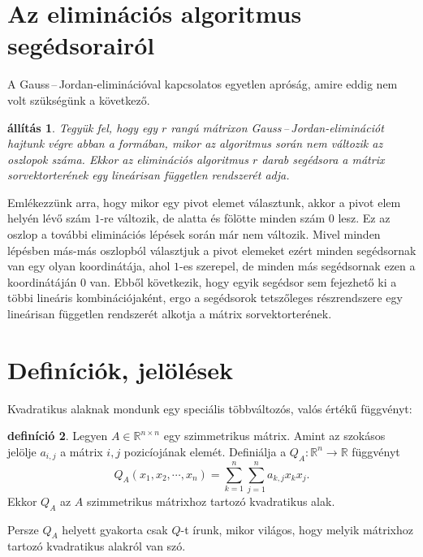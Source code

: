 \documentclass[a4paper, showtrims]{memoir}
\makeatletter
\renewenvironment{proof}[1][\proofname]
    {\par\pushQED{\qed}%
    \normalfont \topsep6\p@\@plus6\p@\relax
    \trivlist
    \item[\hskip\labelsep
        \itshape
    #1\@addpunct{:}]\ignorespaces}
    {\popQED\endtrivlist\@endpefalse}
\theoremstyle{plain}
\newtheorem{proposition}{állítás}[chapter]
\theoremstyle{remark}
\theoremstyle{definition}
\newtheorem{definition}[proposition]{definíció}
\makeatother
\begin{document}
\section{Az eliminációs algoritmus segédsorairól}
A Gauss\,--\,Jordan-eliminációval kapcsolatos egyetlen apróság, amire eddig nem volt szükségünk a következő.
\begin{proposition}
    Tegyük fel, hogy egy $r$ rangú mátrixon Gauss\,--\,Jordan-eliminációt hajtunk végre abban a formában,
    mikor az algoritmus során nem változik az oszlopok száma.
    Ekkor az eliminációs algoritmus $r$ darab segédsora a mátrix sorvektorterének egy lineárisan független rendszerét adja.
\end{proposition}
\begin{proof}
    Emlékezzünk arra, hogy mikor egy pivot elemet választunk,
    akkor a pivot elem helyén lévő szám $1$-re változik, 
    de alatta és fölötte minden szám $0$ lesz.
    Ez az oszlop a további eliminációs lépések során már nem változik.
    Mivel minden lépésben más-más oszlopból választjuk a pivot elemeket ezért minden segédsornak van egy olyan 
    koordinátája, ahol $1$-es szerepel, de minden más segédsornak ezen a koordinátáján $0$ van.
    Ebből következik, hogy egyik segédsor sem fejezhető ki a többi lineáris kombinációjaként, 
    ergo a segédsorok tetszőleges részrendszere egy lineárisan független rendszerét alkotja a mátrix sorvektorterének.
\end{proof}
\section{Definíciók, jelölések}
Kvadratikus alaknak mondunk egy speciális többváltozós, valós értékű függvényt:
\begin{definition}
    Legyen $A\in\mathbb{R}^{n\times n}$ egy szimmetrikus mátrix.
    Amint az szokásos jelölje $a_{i,j}$ a mátrix $i,j$ pozicíojának elemét.
    Definiálja a $Q_A:\mathbb{R}^n\to\mathbb{R}$ függvényt
    \[
    Q_A\left( x_{1},x_2,\cdots,x_n \right)=
    \sum_{k=1}^n\sum_{j=1}^na_{k,j}x_kx_j.
    \]
    Ekkor $Q_A$ az $A$ szimmetrikus mátrixhoz tartozó kvadratikus alak.
\end{definition}
Persze $Q_A$ helyett gyakorta csak $Q$-t írunk, mikor világos, 
hogy melyik mátrixhoz tartozó kvadratikus alakról van szó.
\end{document}
